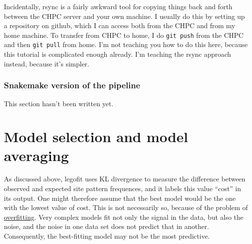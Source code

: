 \documentclass[11pt]{article}
\begin{document}
Incidentally, rsync is a fairly awkward tool for copying things back
and forth between the CHPC server and your own machine. I usually do
this by setting up a repository on github, which I can access both
from the CHPC and from my home machine. To transfer from CHPC to home,
I do \texttt{git push} from the CHPC and then \texttt{git pull} from
home. I'm not teaching you how to do this here, because this tutorial
is complicated enough already. I'm teaching the rsync approach
instead, because it's simpler.

\subsubsection{Snakemake version of the pipeline}
\label{sec.snakemake}
This section hasn't been written yet.

\section{Model selection and model averaging}
\label{sec.msma}
As discussed above, legofit uses KL divergence to measure the
difference between observed and expected site pattern frequences, and
it labels this value ``cost'' in its output. One might therefore
assume that the best model would be the one with the lowest value of
cost. This is not necessarily so, because of the problem of
\href{https://en.wikipedia.org/wiki/Overfitting}{overfitting}. Very
complex models fit not only the signal in the data, but also the
noise, and the noise in one data set does not predict that in
another. Consequently, the best-fitting model may not be the most
predictive.
\end{document}
